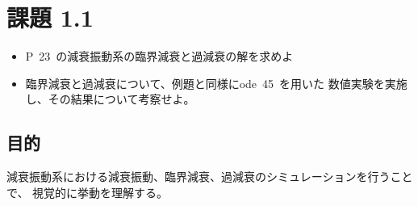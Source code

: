 \documentclass[10pt]{jarticle}
\title{\framebox{\hspace{4zw}数値解析法2 レポート1%
                 \hspace{4zw}}}
\author{神野 友哉 \\
        2022311042  \\
        愛知県立大学 情報科学部 情報科学科 \\}
\date{2024年10月27日}
\begin{document}
\maketitle
\tableofcontents
\clearpage

\newpage
\section{課題 1.1}
%
\begin{itemize}
	\setlength{\leftskip}{1.5cm}
	\item[・] P\ 23\ の減衰振動系の臨界減衰と過減衰の解を求めよ
	\item[・] 臨界減衰と過減衰について、例題と同様にode\ 45\ を用いた
		数値実験を実施し、その結果について考察せよ。
\end{itemize}
%

\subsection{目的}
%
減衰振動系における減衰振動、臨界減衰、過減衰のシミュレーションを行うことで、
視覚的に挙動を理解する。
%
\end{document}
